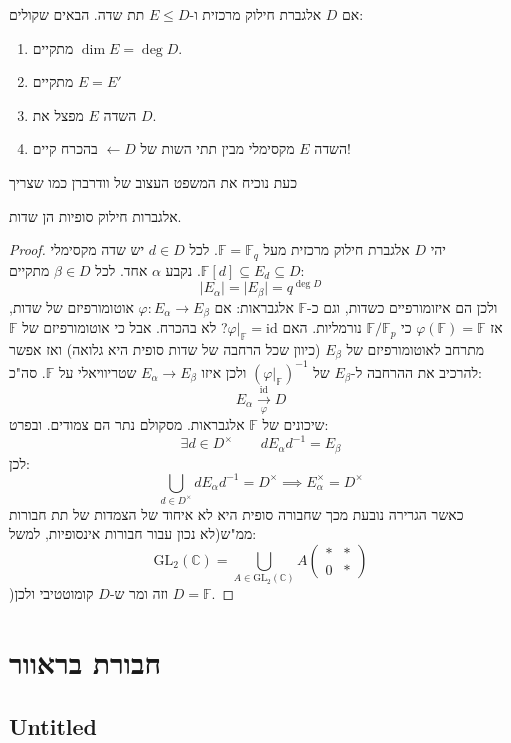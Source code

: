 \documentclass{tstextbook}
\begin{document}
\begin{proposition}
אם \(D\) אלגברת חילוק מרכזית ו-\(E\leq D\) תת שדה. הבאים שקולים:

  \begin{enumerate}
    \item מתקיים \(\dim E = \deg D\). 


    \item מתקיים \(E=E'\)


    \item השדה \(E\) מפצל את \(D\). 


    \item השדה \(E\) מקסימלי מבין תתי השות של \(D\)\(\leftarrow\) בהכרח קיים! 


  \end{enumerate}
\end{proposition}
כעת נוכיח את המשפט העצוב של וודרברן כמו שצריך

\begin{corollary}
אלגברות חילוק סופיות הן שדות.

\end{corollary}
\begin{proof}
יהי \(D\) אלגברת חילוק מרכזית מעל \(\mathbb{F}=\mathbb{F}_{q}\). לכל \(d \in D\) יש שדה מקסימלי \(\mathbb{F}[d]\subseteq E_{d}\subseteq D\). נקבע \(\alpha\) אחד. לכל \(\beta \in D\) מתקיים:
$$\lvert E_{\alpha} \rvert =\lvert E_{\beta} \rvert=q^{\deg D}$$
ולכן הם איזומורפיים כשדות, וגם כ-\(\mathbb{F}\) אלגבראות: אם \(\varphi:E_{\alpha}\to E_{\beta}\) אוטומורפיזם של שדות, אז \(\varphi(\mathbb{F})=\mathbb{F}\) כי \(\mathbb{F} / \mathbb{F}_{p}\) נורמליות. האם \(\varphi|_{\mathbb{F}}=\mathrm{id}\)? לא בהכרח. אבל כי אוטומורפיזם של \(\mathbb{F}\) מתרחב לאוטומורפיזם של \(E_{\beta}\) (כיוון שכל הרחבה של שדות סופית היא גלואה) ואז אפשר להרכיב את ההרחבה ל-\(E_{\beta}\) של \((\varphi|_{\mathbb{F}})^{-1}\) ולכן איזו \(E_{\alpha}\to E_{\beta}\) שטריוויאלי על \(\mathbb{F}\). סה"כ:
$$E_{\alpha}\xrightarrow[\varphi]{\text{id}}D$$
שיכונים של \(\mathbb{F}\) אלגבראות. מסקולם נתר הם צמודים. ובפרט:
$$\exists d \in D^{\times}\qquad dE_{\alpha}d ^{-1}  = E_{\beta}$$
לכן:
$$\bigcup_{d \in D^{\times}}d E_{\alpha }d ^{-1} = D^{\times}\implies E_{\alpha}^{\times}= D^{\times}$$
כאשר הגרירה נובעת מכך שחבורה סופית היא לא איחוד של הצמדות של תת חבורות ממ"ש(לא נכון עבור חבורות אינסופיות, למשל:
$$\text{GL}_{2}(\mathbb{C})=\bigcup_{A \in \text{GL}_{2}(\mathbb{C})}A\begin{pmatrix}*  &  * \\0 & *
\end{pmatrix}$$
)וזה ומר ש-\(D\) קומוטטיבי ולכן \(D=\mathbb{F}\).

\end{proof}
\chapter{חבורת בראוור}

\section{Untitled}
\end{document}
